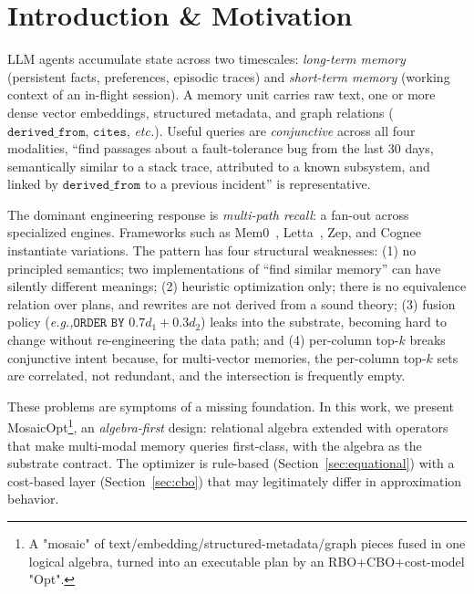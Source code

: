 \documentclass[sigconf]{acmart}
\theoremstyle{plain}
\theoremstyle{definition}
\newcommand{\eg}{\emph{e.g.,}\xspace}
\newcommand{\etc}{\emph{etc.}\xspace}
\theoremstyle{remark}
\begin{document}
\section{Introduction \& Motivation}\label{sec:intro}

LLM agents accumulate state across two timescales: \emph{long-term memory} (persistent facts, preferences, episodic traces) and \emph{short-term memory} (working context of an in-flight session). A memory unit carries raw text, one or more dense vector embeddings, structured metadata, and graph relations ($\texttt{derived\_from}$, $\texttt{cites}$, \etc). Useful queries are \emph{conjunctive} across all four modalities, ``find passages about a fault-tolerance bug from the last 30 days, semantically similar to a stack trace, attributed to a known subsystem, and linked by $\texttt{derived\_from}$ to a previous incident'' is representative.

The dominant engineering response is \emph{multi-path recall}: a fan-out across specialized engines. Frameworks such as Mem0~\cite{mem0}, Letta~\cite{letta}, Zep, and Cognee instantiate variations. The pattern has four structural weaknesses: (1) no principled semantics; two implementations of ``find similar memory'' can have silently different meanings; (2) heuristic optimization only; there is no equivalence relation over plans, and rewrites are not derived from a sound theory; (3) fusion policy (\eg $\texttt{ORDER BY } 0.7d_1+0.3d_2$) leaks into the substrate, becoming hard to change without re-engineering the data path; and (4) per-column top-$k$ breaks conjunctive intent because, for multi-vector memories, the per-column top-$k$ sets are correlated, not redundant, and the intersection is frequently empty.

These problems are symptoms of a missing foundation. In this work, we present MosaicOpt\footnote{A "mosaic" of text/embedding/structured-metadata/graph pieces fused in one logical algebra, turned into an executable plan by an RBO+CBO+cost-model "Opt".}, an \emph{algebra-first} design: relational algebra extended with operators that make multi-modal memory queries first-class, with the algebra as the substrate contract. The optimizer is rule-based (Section~\ref{sec:equational}) with a cost-based layer (Section~\ref{sec:cbo}) that may legitimately differ in approximation behavior.
\end{document}
